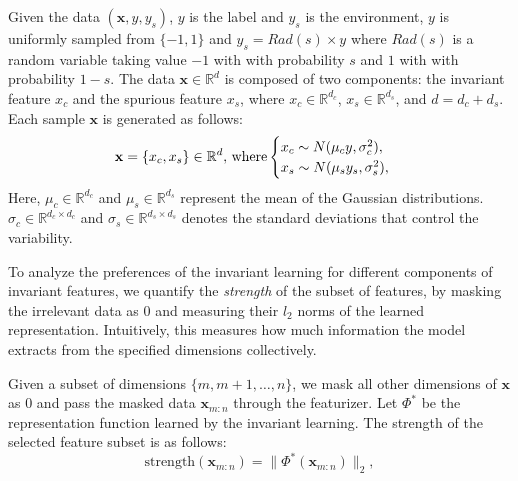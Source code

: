 \begin{definition}
    Given the data $(\mathbf{x}, y, y_{s})$, $y$ is the label and $y_{s}$ is the environment, $y$ is uniformly sampled from $\{-1, 1\}$ and $y_s=Rad(s) \times y$ where $Rad(s)$ is a random variable taking value $-1$ with with probability $s$ and $1$ with with probability $1-s$. 
The data $\mathbf{x} \in \mathbb{R}^{d}$ is composed of two components: the invariant feature $x_c$ and the spurious feature $x_s$, where $x_c \in \mathbb{R}^{d_c}$, $x_s \in \mathbb{R}^{d_s}$, and $d = d_c + d_s$.
Each sample $\mathbf{x}$ is generated as follows: 
\[
    \mathbf{x} = \{x_c, x_s\} \in \mathbb{R}^d, \, \text{where} \\
    \begin{cases} 
        x_c \sim N(\mu_c y, \sigma_c^2),  \\ 
        x_s \sim N(\mu_s y_{s}, \sigma_s^2),
    \end{cases} 
\]
Here, $\mu_c \in \mathbb{R}^{d_c}$ and $\mu_s \in \mathbb{R}^{d_s}$ represent the mean of the Gaussian distributions. 
$\sigma_c \in \mathbb{R}^{d_c \times d_c}$ and $\sigma_s \in \mathbb{R}^{d_s \times d_s}$ denotes the standard deviations that control the variability.
\end{definition}

To analyze the preferences of the invariant learning for different components of invariant features, we quantify the \textit{strength} of the subset of features, by masking the irrelevant data as 0 and measuring their $l_2$ norms of the learned representation. Intuitively, this measures how much information the model extracts from the specified dimensions collectively.
\begin{definition}[Strength]
    Given a subset of dimensions $\{m, m+1, \dots, n\}$, we mask all other dimensions of $\mathbf{x}$ as $0$ and pass the masked data $\mathbf{x}_{m:n}$ through the featurizer. 
    Let $\Phi^*$ be the representation function learned by the invariant learning.
    The strength of the selected feature subset is as follows:
    \begin{equation}
    \text{strength}(\mathbf{x}_{m:n}) = \|\Phi^*(\mathbf{x}_{m:n})\|_2,
\end{equation}
\end{definition}

